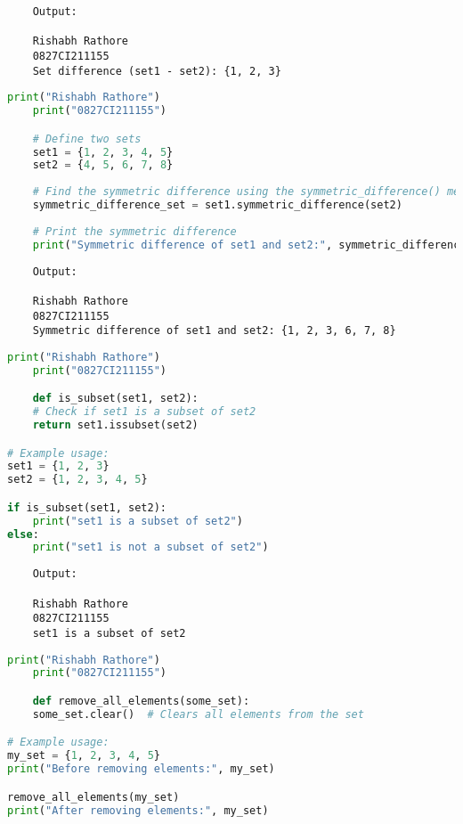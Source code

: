 \documentclass{report}
\begin{document}
\begin{verbatim}
	Output:

	Rishabh Rathore
	0827CI211155
	Set difference (set1 - set2): {1, 2, 3}

\end{verbatim}

\newpage


\sol 
\begin{lstlisting}[language=Python]
	print("Rishabh Rathore")
	print("0827CI211155")

	# Define two sets
	set1 = {1, 2, 3, 4, 5}
	set2 = {4, 5, 6, 7, 8}
	
	# Find the symmetric difference using the symmetric_difference() method
	symmetric_difference_set = set1.symmetric_difference(set2)
	
	# Print the symmetric difference
	print("Symmetric difference of set1 and set2:", symmetric_difference_set)
\end{lstlisting}

\begin{verbatim}
	Output:

	Rishabh Rathore
	0827CI211155
	Symmetric difference of set1 and set2: {1, 2, 3, 6, 7, 8}
\end{verbatim}

\newpage


\sol 
\begin{lstlisting}[language=Python]
	print("Rishabh Rathore")
	print("0827CI211155")

	def is_subset(set1, set2):
    # Check if set1 is a subset of set2
    return set1.issubset(set2)

# Example usage:
set1 = {1, 2, 3}
set2 = {1, 2, 3, 4, 5}

if is_subset(set1, set2):
    print("set1 is a subset of set2")
else:
    print("set1 is not a subset of set2")
\end{lstlisting}

\begin{verbatim}
	Output:

	Rishabh Rathore
	0827CI211155
	set1 is a subset of set2

\end{verbatim}

\newpage


\sol 
\begin{lstlisting}[language=Python]
	print("Rishabh Rathore")
	print("0827CI211155")

	def remove_all_elements(some_set):
    some_set.clear()  # Clears all elements from the set

# Example usage:
my_set = {1, 2, 3, 4, 5}
print("Before removing elements:", my_set)

remove_all_elements(my_set)
print("After removing elements:", my_set)
\end{lstlisting}
\end{document}
